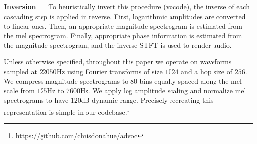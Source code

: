 \documentclass[a4paper]{article}
\begin{document}
\textbf{Inversion}~~~
To heuristically invert this procedure (vocode), 
the inverse of each cascading step is applied in reverse.
First, logarithmic amplitudes are converted to linear ones. 
Then,  
an appropriate magnitude spectrogram is estimated from the mel spectrogram.
Finally, appropriate phase information is estimated from the magnitude spectrogram, and the inverse STFT is used to render audio.

Unless otherwise specified, throughout this paper we operate on waveforms sampled at $22050$Hz using Fourier transforms of size $1024$ and a hop size of $256$. 
We compress magnitude spectrograms to $80$ bins equally spaced along the mel scale from $125$Hz to $7600$Hz.
We apply log amplitude scaling and normalize mel spectrograms to have $120$dB dynamic range. 
Precisely recreating this representation is simple in our codebase.\footnote{\url{https://github.com/chrisdonahue/advoc}}

\end{document}
